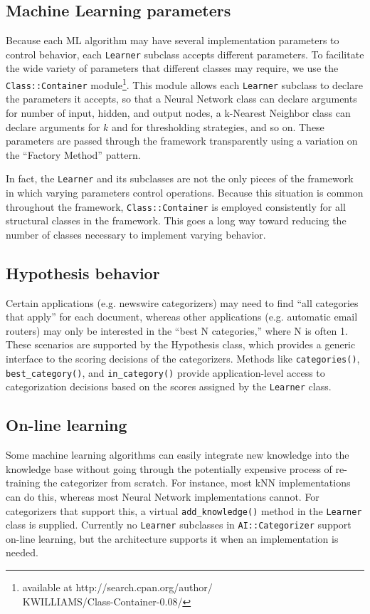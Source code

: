 \documentclass[a4paper,twocolumn]{article}
\begin{document}
\subsection{Machine Learning parameters}
Because each ML algorithm may have several implementation parameters
to control behavior, each \texttt{Learner} subclass accepts different
parameters.  To facilitate the wide variety of parameters that
different classes may require, we use the \texttt{Class::Container}
module\footnote{available at http://search.cpan.org/author/\\
KWILLIAMS/Class-Container-0.08/}.  This module allows each
\texttt{Learner} subclass to declare the parameters it accepts, so
that a Neural Network class can declare arguments for number of input,
hidden, and output nodes, a k-Nearest Neighbor class can declare
arguments for $k$ and for thresholding strategies, and so on.  These
parameters are passed through the framework transparently using a
variation on the ``Factory Method'' pattern. \cite{gamma:95}

In fact, the \texttt{Learner} and its subclasses are not the only
pieces of the framework in which varying parameters control
operations.  Because this situation is common throughout the
framework, \texttt{Class::Container} is employed consistently for all
structural classes in the framework.  This goes a long way toward
reducing the number of classes necessary to implement varying
behavior.

\subsection{Hypothesis behavior}
Certain applications (e.g. newswire categorizers) may need to find
``all categories that apply'' for each document, whereas other
applications (e.g. automatic email routers) may only be interested in
the ``best N categories,'' where N is often 1.  These scenarios are
supported by the Hypothesis class, which provides a generic interface
to the scoring decisions of the categorizers.  Methods like
\texttt{categories()}, \texttt{best\_category()}, and
\texttt{in\_category()} provide application-level access to
categorization decisions based on the scores assigned by the
\texttt{Learner} class.

\subsection{On-line learning}
Some machine learning algorithms can easily integrate new knowledge
into the knowledge base without going through the potentially
expensive process of re-training the categorizer from scratch.  For
instance, most kNN implementations can do this, whereas most Neural
Network implementations cannot.  For categorizers that support this, a
virtual \texttt{add\_knowledge()} method in the \texttt{Learner} class
is supplied.  Currently no \texttt{Learner} subclasses in
\texttt{AI::Categorizer} support on-line learning, but the
architecture supports it when an implementation is needed.
\end{document}
